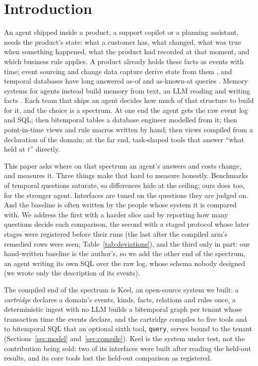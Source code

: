 \documentclass[sigconf, nonacm]{acmart}
\newcommand{\code}[1]{\texttt{#1}}
\begin{document}
\vldbtopmatter

\section{Introduction}
\label{sec:intro}

An agent shipped inside a product, a support copilot or a planning assistant, needs the product's state: what a customer has, what changed, what was true when something happened, what the product had recorded at that moment, and which business rule applies. A product already holds these facts as events with time; event sourcing and change data capture derive state from them \cite{fowler-es,debezium}, and temporal databases have long answered as-of and as-known-at queries \cite{jensen-glossary,snodgrass-book}. Memory systems for agents instead build memory from text, an LLM reading and writing facts \cite{mem0,zep}. Each team that ships an agent decides how much of that structure to build for it, and the choice is a spectrum. At one end the agent gets the raw event log and SQL; then bitemporal tables a database engineer modelled from it; then point-in-time views and rule macros written by hand; then views compiled from a declaration of the domain; at the far end, task-shaped tools that answer ``what held at $t$'' directly.

This paper asks where on that spectrum an agent's answers and costs change, and measures it. Three things make that hard to measure honestly. Benchmarks of temporal questions saturate, so differences hide at the ceiling; ours does too, for the stronger agent. Interfaces are tuned on the questions they are judged on. And the baseline is often written by the people whose system it is compared with. We address the first with a harder slice and by reporting how many questions decide each comparison, the second with a staged protocol whose later stages were registered before their runs (the last after the compiled arm's remedied rows were seen; Table~\ref{tab:deviations}), and the third only in part: our hand-written baseline is the author's, so we add the other end of the spectrum, an agent writing its own SQL over the raw log, whose schema nobody designed (we wrote only the description of its events).

The compiled end of the spectrum is Keel, an open-source system we built: a \emph{cartridge} declares a domain's events, kinds, facts, relations and rules once, a deterministic ingest with no LLM builds a bitemporal graph per tenant whose transaction time the events declare, and the cartridge compiles to five tools and to bitemporal SQL that an optional sixth tool, \code{query}, serves bound to the tenant (Sections~\ref{sec:model} and~\ref{sec:compile}). Keel is the system under test, not the contribution being sold: two of its interfaces were built after reading the held-out results, and its core tools lost the held-out comparison as registered.
\end{document}
